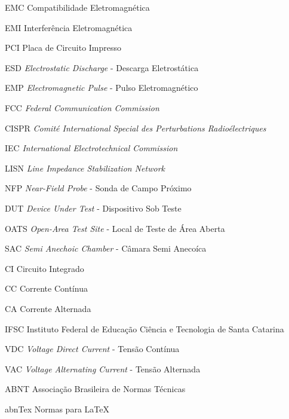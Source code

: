 \documentclass{ifscTCC} %
\begin{document}
\listoffigures*
\cleardoublepage

\listoftables*
\cleardoublepage

\begin{siglas}
   \item[EMC] Compatibilidade Eletromagnética
   \item[EMI] Interferência Eletromagnética
   \item[PCI] Placa de Circuito Impresso
   \item[ESD] \textit{Electrostatic Discharge} - Descarga Eletrostática
   \item[EMP] \textit{Electromagnetic Pulse} - Pulso Eletromagnético
   \item[FCC] \textit{Federal Communication Commission}
   \item[CISPR] \textit{Comité International Special des Perturbations Radioélectriques}
   \item[IEC] \textit{International Electrotechnical Commission}
   \item[LISN] \textit{Line Impedance Stabilization Network}
   \item[NFP] \textit{Near-Field Probe} - Sonda de Campo Próximo
   \item[DUT] \textit{Device Under Test} - Dispositivo Sob Teste
   \item[OATS] \textit{Open-Area Test Site} - Local de Teste de Área Aberta
   \item[SAC] \textit{Semi Anechoic Chamber} - Câmara Semi Anecoíca
   \item[CI] Circuito Integrado
   \item[CC] Corrente Contínua
   \item[CA] Corrente Alternada
   \item[IFSC] Instituto Federal de Educação Ciência e Tecnologia de Santa Catarina
   \item[VDC] \textit{Voltage Direct Current} - Tensão Contínua
   \item[VAC] \textit{Voltage Alternating Current} - Tensão Alternada
   \item[ABNT] Associação Brasileira de Normas Técnicas
   \item[abnTex] Normas para \LaTeX
   \end{siglas}
\end{document}
